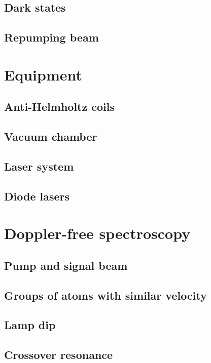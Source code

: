 \documentclass[11pt, english, fleqn, DIV=15, headinclude, BCOR=2cm]{scrreprt}
\begin{document}
\subsection{Dark states}

\subsection{Repumping beam}

\section{Equipment}

\subsection{Anti-Helmholtz coils}

\subsection{Vacuum chamber}

\subsection{Laser system}

\subsection{Diode lasers}

\section{Doppler-free spectroscopy}

\subsection{Pump and signal beam}

\subsection{Groups of atoms with similar velocity}

\subsection{Lamp dip}

\subsection{Crossover resonance}
\end{document}

